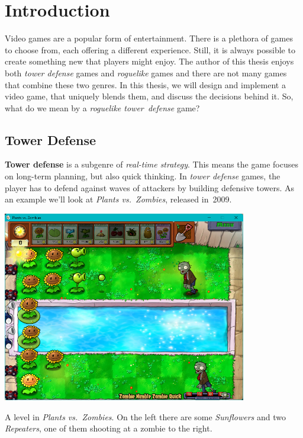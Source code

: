 \chapter{Introduction}

Video games are a popular form of entertainment.
There is a plethora of games to choose from, each offering a different experience.
Still, it is always possible to create something new that players might enjoy.
The author of this thesis enjoys both \emph{tower defense} games and \emph{roguelike} games and there are not many games that combine these two genres.
In this thesis, we will design and implement a video game, that uniquely blends them, and discuss the decisions behind it.
So, what do we mean by a \emph{roguelike tower~defense} game?

\section{Tower Defense}

\textbf{Tower defense} is a subgenre of \emph{real-time strategy}.
This means the game focuses on long-term planning, but also quick thinking.
In \emph{tower defense} games, the player has to defend against waves of attackers by building defensive towers.
As an example we'll look at \emph{Plants vs.\ Zombies}\cite{PvZWiki}, released in~2009.

\begin{center}
    \captionsetup{type=figure}
    \includegraphics[width=0.8\textwidth]{img/Plants-vs-Zombies-Fight.png}
    \caption{A level in \emph{Plants vs.\ Zombies}. On the left there are some \emph{Sunflowers} and two \emph{Repeaters}, one of them shooting at a zombie to the right.}
    \label{fig:pvz-fight}
\end{center}

